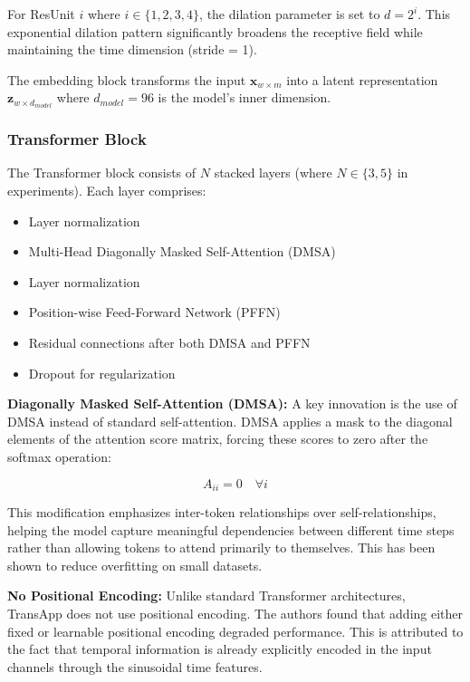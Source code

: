 \documentclass[conference]{IEEEtran}
\begin{document}
For ResUnit $i$ where $i \in \{1, 2, 3, 4\}$, the dilation parameter is set to $d = 2^i$. This exponential dilation pattern significantly broadens the receptive field while maintaining the time dimension (stride = 1).

The embedding block transforms the input $\mathbf{x}_{w \times m}$ into a latent representation $\mathbf{z}_{w \times d_{model}}$ where $d_{model} = 96$ is the model's inner dimension.

\subsubsection{Transformer Block}

The Transformer block consists of $N$ stacked layers (where $N \in \{3, 5\}$ in experiments). Each layer comprises:
\begin{itemize}
    \item Layer normalization
    \item Multi-Head Diagonally Masked Self-Attention (DMSA)
    \item Layer normalization
    \item Position-wise Feed-Forward Network (PFFN)
    \item Residual connections after both DMSA and PFFN
    \item Dropout for regularization
\end{itemize}

\textbf{Diagonally Masked Self-Attention (DMSA):} A key innovation is the use of DMSA instead of standard self-attention. DMSA applies a mask to the diagonal elements of the attention score matrix, forcing these scores to zero after the softmax operation:

\begin{equation}
A_{ii} = 0 \quad \forall i
\end{equation}

This modification emphasizes inter-token relationships over self-relationships, helping the model capture meaningful dependencies between different time steps rather than allowing tokens to attend primarily to themselves. This has been shown to reduce overfitting on small datasets.

\textbf{No Positional Encoding:} Unlike standard Transformer architectures, TransApp does not use positional encoding. The authors found that adding either fixed or learnable positional encoding degraded performance. This is attributed to the fact that temporal information is already explicitly encoded in the input channels through the sinusoidal time features.
\end{document}
